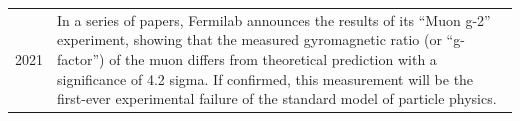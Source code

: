 \documentclass[../../../main.tex]{subfiles}
\begin{document}
\begin{center}
\begin{longtable}{p{}  p{}}
2021&In a series of papers, Fermilab announces the results of its “Muon g-2” experiment, showing that the measured gyromagnetic ratio (or “g-factor”) of the muon differs from theoretical prediction with a significance of 4.2 sigma. If confirmed, this measurement will be the first-ever experimental failure of the standard model of particle physics.
    \end{longtable}
\end{center}
\end{document}
